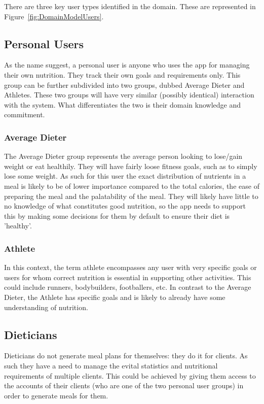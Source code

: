 \documentclass[12pt]{article}
\begin{document}
There are three key user types identified in the domain. These are represented in Figure~\ref{fig:DomainModelUsers}.

\subsection{Personal Users}
As the name suggest, a personal user is anyone who uses the app for managing their own nutrition. They track their own goals and requirements only. This group can be further subdivided into two groups, dubbed Average Dieter and Athletes. These two groups will have very similar (possibly identical) interaction with the system. What differentiates the two is their domain knowledge and commitment.
\subsubsection{Average Dieter}
The Average Dieter group represents the average person looking to lose/gain weight or eat healthily. They will have fairly loose fitness goals, such as to simply lose some weight. As such for this user the exact distribution of nutrients in a meal is likely to be of lower importance compared to the total calories, the ease of preparing the meal and the palatability of the meal. They will likely have little to no knowledge of what constitutes good nutrition, so the app needs to support this by making some decisions for them by default to ensure their diet is 'healthy'. 

\subsubsection{Athlete}
In this context, the term athlete encompasses any user with very specific goals or users for whom correct nutrition is essential in supporting other activities. This could include runners, bodybuilders, footballers, etc. In contrast to the Average Dieter, the Athlete has specific goals and is likely to already have some understanding of nutrition. 

\subsection{Dieticians}
Dieticians do not generate meal plans for themselves: they do it for clients. As such they have a need to manage the evital statistics and nutritional requirements of multiple clients. This could be achieved by giving them access to the accounts of their clients (who are one of the two personal user groups) in order to generate meals for them. 
\end{document}
